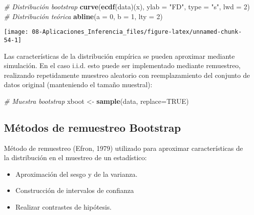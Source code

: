 \documentclass[
]{book}
\newenvironment{Shaded}{\begin{snugshade}}{\end{snugshade}}
\newcommand{\CommentTok}[1]{\textcolor[rgb]{0.56,0.35,0.01}{\textit{#1}}}
\newcommand{\DataTypeTok}[1]{\textcolor[rgb]{0.13,0.29,0.53}{#1}}
\newcommand{\DecValTok}[1]{\textcolor[rgb]{0.00,0.00,0.81}{#1}}
\newcommand{\KeywordTok}[1]{\textcolor[rgb]{0.13,0.29,0.53}{\textbf{#1}}}
\newcommand{\NormalTok}[1]{#1}
\newcommand{\OtherTok}[1]{\textcolor[rgb]{0.56,0.35,0.01}{#1}}
\newcommand{\StringTok}[1]{\textcolor[rgb]{0.31,0.60,0.02}{#1}}
\theoremstyle{break}
\theoremstyle{definition}
\theoremstyle{definition}
\theoremstyle{definition}
\theoremstyle{remark}
\begin{document}
\begin{Shaded}
\begin{Highlighting}[]
 \CommentTok{# Distribución bootstrap}
\KeywordTok{curve}\NormalTok{(}\KeywordTok{ecdf}\NormalTok{(data)(x), }\DataTypeTok{ylab =} \StringTok{"FD"}\NormalTok{, }\DataTypeTok{type =} \StringTok{"s"}\NormalTok{, }\DataTypeTok{lwd =} \DecValTok{2}\NormalTok{)}
\CommentTok{# Distribución teórica}
\KeywordTok{abline}\NormalTok{(}\DataTypeTok{a =} \DecValTok{0}\NormalTok{, }\DataTypeTok{b =} \DecValTok{1}\NormalTok{, }\DataTypeTok{lty =} \DecValTok{2}\NormalTok{) }
\end{Highlighting}
\end{Shaded}

\begin{center}\texttt{[image: 08-Aplicaciones\_Inferencia\_files/figure-latex/unnamed-chunk-54-1]} \end{center}

Las características de la distribución empírica se pueden aproximar mediante simulación.
En el caso i.i.d. esto puede ser implementado mediante remuestreo,
realizando repetidamente muestreo aleatorio con reemplazamiento
del conjunto de datos original (manteniendo el tamaño muestral):

\begin{Shaded}
\begin{Highlighting}[]
 \CommentTok{# Muestra bootstrap}
\NormalTok{xboot <-}\StringTok{ }\KeywordTok{sample}\NormalTok{(data, }\DataTypeTok{replace=}\OtherTok{TRUE}\NormalTok{)}
\end{Highlighting}
\end{Shaded}

\hypertarget{muxe9todos-de-remuestreo-bootstrap}{%
\subsection{Métodos de remuestreo Bootstrap}\label{muxe9todos-de-remuestreo-bootstrap}}

Método de remuestreo (Efron, 1979) utilizado para aproximar
características de la distribución en el muestreo de un estadístico:

\begin{itemize}
\item
  Aproximación del sesgo y de la varianza.
\item
  Construcción de intervalos de confianza
\item
  Realizar contrastes de hipótesis.
\end{itemize}
\end{document}
